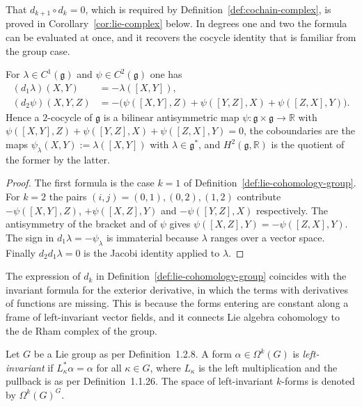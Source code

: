 \noindent That $d_{k+1}\circ d_k=0$, which is required by Definition~\ref{def:cochain-complex}, is proved in Corollary~\ref{cor:lie-complex} below. In degrees one and two the formula can be evaluated at once, and it recovers the cocycle identity that is familiar from the group case.

\begin{proposition}\label{prop:lie-degree-two}
	For $\lambda\in C^1(\mathfrak{g})$ and $\psi\in C^2(\mathfrak{g})$ one has
	\begin{align*}
		(d_1\lambda)(X,Y)&=-\lambda([X,Y]),\\
		(d_2\psi)(X,Y,Z)&=-\big(\psi([X,Y],Z)+\psi([Y,Z],X)+\psi([Z,X],Y)\big).
	\end{align*}
	Hence a $2$-cocycle of $\mathfrak{g}$ is a bilinear antisymmetric map $\psi:\mathfrak{g}\times\mathfrak{g}\to\mathbb{R}$ with $\psi([X,Y],Z)+\psi([Y,Z],X)+\psi([Z,X],Y)=0$, the coboundaries are the maps $\psi_\lambda(X,Y):=\lambda([X,Y])$ with $\lambda\in\mathfrak{g}^*$, and $H^2(\mathfrak{g},\mathbb{R})$ is the quotient of the former by the latter.
\end{proposition}

\begin{proof}
	The first formula is the case $k=1$ of Definition~\ref{def:lie-cohomology-group}. For $k=2$ the pairs $(i,j)=(0,1),(0,2),(1,2)$ contribute $-\psi([X,Y],Z)$, $+\psi([X,Z],Y)$ and $-\psi([Y,Z],X)$ respectively. The antisymmetry of the bracket and of $\psi$ gives $\psi([X,Z],Y)=-\psi([Z,X],Y)$. The sign in $d_1\lambda=-\psi_\lambda$ is immaterial because $\lambda$ ranges over a vector space. Finally $d_2d_1\lambda=0$ is the Jacobi identity applied to $\lambda$.
\end{proof}

The expression of $d_k$ in Definition~\ref{def:lie-cohomology-group} coincides with the invariant formula for the exterior derivative, in which the terms with derivatives of functions are missing. This is because the forms entering are constant along a frame of left-invariant vector fields, and it connects Lie algebra cohomology to the de Rham complex of the group.

\begin{definition}\label{def:left-invariant-form}
	Let $G$ be a Lie group as per Definition~1.2.8. A form $\alpha\in\Omega^k(G)$ is \emph{left-invariant} if $L_\kappa^*\alpha=\alpha$ for all $\kappa\in G$, where $L_\kappa$ is the left multiplication and the pullback is as per Definition~1.1.26. The space of left-invariant $k$-forms is denoted by $\Omega^k(G)^G$.
\end{definition}

